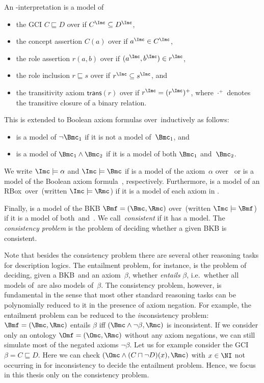 \begin{definition}
  \label{def:semantics-of-axioms}
  An \Nsig-interpretation \I is a model of
  \begin{itemize}
  \item the GCI $C \sqsubseteq D$ over \Nsig if $C^{\I} \subseteq D^{\I}$,
  \item the concept assertion $C(a)$ over \Nsig if $a^{\I} \in C^{\I}$,
  \item the role assertion $r(a,b)$ over \Nsig if $(a^\I,b^\I)\in r^\I$,
  \item the role inclusion $r \sqsubseteq s$ over \Nsig if $r^\I \subseteq s^\I$, and
  \item the transitivity axiom $\mathsf{trans}(r)$ over \Nsig if $r^\I=(r^\I)^+$, where $\cdot^{+}$
    denotes the transitive closure of a binary relation.
  \end{itemize}
  This is extended to Boolean axiom formulas over~\Nsig inductively as follows:
  \begin{itemize}
  \item \I is a model of $\lnot\Bmc_1$ if it is not a model of~$\Bmc_1$, and
  \item \I is a model of $\Bmc_1\land\Bmc_2$ if it is a model of both $\Bmc_1$ and~$\Bmc_2$.
  \end{itemize}
  We write $\I\models\alpha$ and $\I\models\Bmc$ if \I is a model of the axiom~$\alpha$ over~\Nsig
  or \I is a model of the Boolean axiom formula~\Bmc, respectively. Furthermore, \I is a model of an
  RBox~\Rmc over~\Nsig (written $\I\models\Rmc$) if it is a model of each axiom in \Rmc.

  Finally, \I is a model of the BKB $\Bmf=(\Bmc,\Rmc)$ over~\Nsig (written $\I\models\Bmf$) if it is a
  model of both~\Bmc and~\Rmc.  We call~\Bmf \emph{consistent} if it has a model.  The
  \emph{consistency problem} is the problem of deciding whether a given BKB is consistent.
\end{definition}

\noindent
Note that besides the consistency problem there are several other reasoning tasks for description
logics.  The entailment problem, for instance, is the problem of deciding, given a BKB~\Bmf and an
axiom~$\beta$, whether \Bmf \emph{entails} $\beta$, i.e.~whether all models of~\Bmf are also models
of~$\beta$.
%
The consistency problem, however, is fundamental in the sense that most other standard reasoning
tasks can be polynomially reduced to it in the presence of axiom negation.  For example, the
entailment problem can be reduced to the \emph{in}consistency problem: $\Bmf=(\Bmc,\Rmc)$ entails
$\beta$ iff $(\Bmc\land\lnot\beta,\Rmc)$ is inconsistent. If we consider only an ontology $\Omf=(\Omc,\Rmc)$ without
any axiom negations, we can still simulate most of the negated axioms $\lnot\beta$. Let us for
example consider the GCI
$\beta = C \sqsubseteq D$. Here we can check $(\Omc\land (C \sqcap \lnot D)(x),\Rmc)$ with $x\in\NI$
not occurring in \Omc for inconsistency to
decide the entailment problem.
%
Hence, we focus in this thesis only on the consistency problem.

